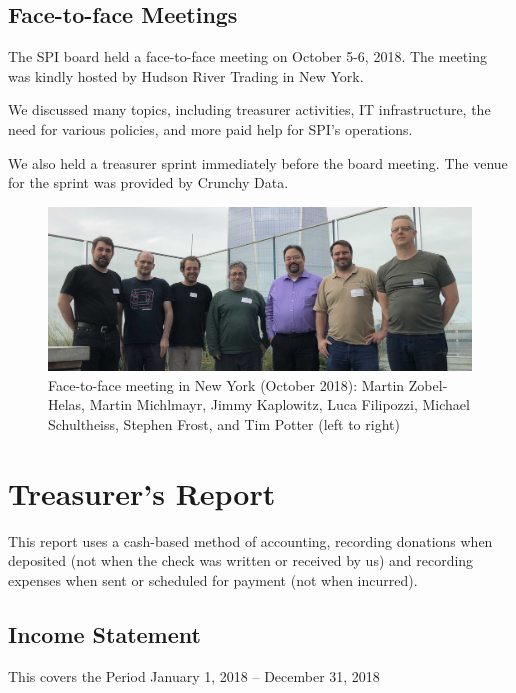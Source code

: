 \documentclass[a4paper]{report}
\begin{document}
\section{Face-to-face Meetings}

The SPI board held a face-to-face meeting on October 5-6, 2018.
The meeting was kindly hosted by Hudson River Trading in New York.

We discussed many topics, including treasurer activities, IT
infrastructure, the need for various policies, and more paid help for
SPI's operations.

We also held a treasurer sprint immediately before the board meeting.
The venue for the sprint was provided by Crunchy Data.

\begin{figure}[h]
\centering

\includegraphics[scale=0.14]{images/2018-october-f2f}

\caption{Face-to-face meeting in New York (October 2018): Martin
Zobel-Helas, Martin Michlmayr, Jimmy Kaplowitz, Luca Filipozzi, Michael
Schultheiss, Stephen Frost, and Tim Potter (left to right)}

\end{figure}

\chapter{Treasurer's Report}

This report uses a cash-based method of accounting, recording donations
when deposited (not when the check was written or received by us) and
recording expenses when sent or scheduled for payment (not when
incurred).

\section{Income Statement}

This covers the Period January 1, 2018 -- December 31, 2018
\end{document}
